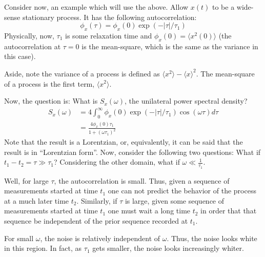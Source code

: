 \documentclass{article}
\begin{document}
Consider now, an example which will use the above. Allow $ x(t) $ to be a
wide-sense stationary process. It has the following autocorrelation:
\[
   \phi_{x}(\tau) = \phi_{x}(0)\exp(-|\tau|/\tau_{1})
\]
Physically, now, $ \tau_{1} $ is some relaxation time and $ \phi_{x}(0) =
\langle x^{2}(0) \rangle $ (the autocorrelation at $ \tau=0 $ is the
mean-square, which is the same as the variance in this case).

Aside, note the variance of a process is defined as $ \langle x^2 \rangle -
\langle x \rangle^2 $. The mean-square of a process is the first term, $ \langle
x^2 \rangle$.

Now, the question is: What is $ S_{x}(\omega) $, the unilateral power
spectral density?
\begin{align*}
   S_{x}(\omega) &= 4 \int_{0}^{\infty} \phi_{x}(0)
   \exp(-|\tau|/\tau_1)\cos(\omega\tau) d\tau \\
   &= \frac{4\phi_{x}(0)\tau_{1}}{1+\left( \omega \tau_{1} \right)^2}
\end{align*}
Note that the result is a Lorentzian, or, equivalently, it can be said that the
result is in ``Lorentzian form''.
Now, consider the following two questions: What if $ t_1 - t_2 = \tau \gg
\tau_{1} $? Considering the other domain, what if $ \omega \ll \frac{1}{\tau_1} $.

Well, for large $ \tau $, the autocorrelation is small. Thus, given a sequence
of measurements started at time $ t_{1} $ one can not predict the behavior of
the process at a much later time $ t_{2} $. Similarly, if $ \tau $ is large,
given some sequence of measurements started at time $ t_{1} $ one must wait a
long time $ t_{2} $ in order that that sequence be independent of the prior
sequence recorded at $ t_{1} $.

For small $ \omega $, the noise is relatively independent of $ \omega $. Thus,
the noise looks white in this region. In fact, as $ \tau_{1} $ gets smaller, the
noise looks increasingly whiter.
\end{document}
